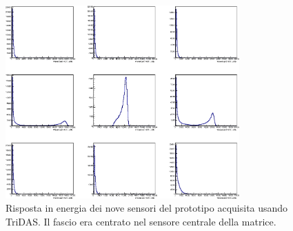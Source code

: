 \documentclass[../main.tex]{subfiles}
\begin{document}
\begin{figure}[tb]
    \centering
    \includegraphics[width=0.8\textwidth]{3x3graph_trasp.png}
    \caption{
    Risposta in energia dei nove sensori del prototipo acquisita usando TriDAS. Il fascio era centrato nel sensore centrale della matrice.  
	\cite{3x3telescope}}
    \label{fig:3x3graph}
\end{figure}
\end{document}
